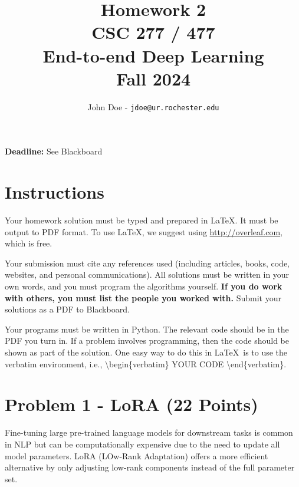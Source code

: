 \documentclass[11pt, oneside]{article}   	%
\title{Homework 2 \\ CSC 277 / 477 \\ End-to-end Deep Learning \\ Fall 2024}
\author{John Doe - \texttt{jdoe@ur.rochester.edu}}
\date{}
\begin{document}
\maketitle

\begin{center}
    \textbf{Deadline:} See Blackboard    
\end{center}


\section*{Instructions}

Your homework solution must be typed and prepared in \LaTeX. It must be output to PDF format. To use \LaTeX, we suggest using \url{http://overleaf.com}, which is free.

Your submission must cite any references used (including articles, books, code, websites, and personal communications).  All solutions must be written in your own words, and you must program the algorithms yourself. \textbf{If you do work with others, you must list the people you worked with.} Submit your solutions as a PDF to Blackboard. 


Your programs must be written in Python. The relevant code should be in the PDF you turn in. If a problem involves programming, then the code should be shown as part of the solution. One easy way to do this in \LaTeX \, is to use the verbatim environment, i.e., \textbackslash begin\{verbatim\} YOUR CODE \textbackslash end\{verbatim\}.










\clearpage



\section*{Problem 1 - LoRA (22 Points)}
Fine-tuning large pre-trained language models for downstream tasks is common in NLP but can be computationally expensive due to the need to update all model parameters. LoRA (LOw-Rank Adaptation) offers a more efficient alternative by only adjusting low-rank components instead of the full parameter set.
\end{document}
